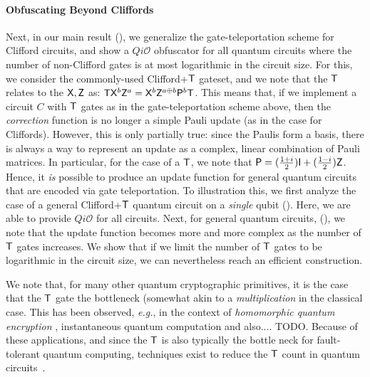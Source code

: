 \paragraph{Obfuscating Beyond Cliffords} Next, in our main result (), we generalize the gate-teleportation scheme for Clifford circuits, and show a $Qi\mathcal{O}$ obfuscator for all quantum circuits where the number of non-Clifford  gates is at most logarithmic in the circuit size. For this, we consider the commonly-used Clifford+${\sf T}$ gateset, and we note that the ${\sf T}$ relates to the ${\sf X}, {\sf Z}$ as: ${\sf T} {\sf X}^b {\sf Z}^a={\sf X}^b {\sf Z}^{a\oplus b}{\sf P}^b {\sf T}$. This means that, if we implement a circuit $C$ with ${\sf T}$ gates as in the gate-teleportation scheme above, then the \emph{correction} function is no longer a simple Pauli update (as in the case for Cliffords). However, this is only partially true: since the Paulis form a basis, there is always a way to represent an update as a complex, linear combination of Pauli matrices. In particular, for the case of a ${\sf T}$, we note that ${\sf P}=(\frac{1+i}{2}) {\sf I} + (\frac{1-i}{2}){\sf Z}$. Hence, it \emph{is} possible to produce an update function for general quantum circuits that are encoded via gate teleportation. To illustration this, we first analyze the case of a general Clifford+${\sf T}$ quantum circuit on a \emph{single} qubit (). Here, we are able to provide $Qi\mathcal{O}$ for all circuits. Next, for general quantum circuits, (), we note that the update function becomes more and more complex as the number of ${\sf T}$ gates increases. We show that if we limit the number of ${\sf T}$ gates to be logarithmic in the circuit size, we can nevertheless reach an efficient construction.


We note that,  for many other quantum cryptographic primitives, it is the case that the ${\sf T}$ gate the bottleneck (somewhat akin to a \emph{multiplication} in the classical case. This has been observed, \emph{e.g.}, in the context of \emph{homomorphic quantum encryption} \cite{BJ15}, instantaneous quantum computation \cite{TODO} and also.... TODO. Because of these applications, and since the ${\sf T}$ is also typically the bottle neck for fault-tolerant quantum computing, techniques exist to reduce the ${\sf T}$ count in quantum circuits~\cite{AMMR13,DMM16,AMM14}.



